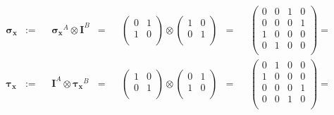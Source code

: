 \documentclass[solutions.tex]{subfiles}
\begin{document}
\begin{equation*}\begin{aligned}
	\bm{\sigma_x} &:=&& \bm{\sigma_x}^A\otimes\bm{I}^B &=&&
	\begin{pmatrix}
		0 & 1 \\
		1 & 0 \\
	\end{pmatrix}\otimes\begin{pmatrix}
		1 & 0 \\
		0 & 1 \\
	\end{pmatrix} &=&& \begin{pmatrix}
		0 & 0 & 1  & 0  \\
		0 & 0 & 0  & 1  \\
		1 & 0 & 0  & 0  \\
		0 & 1 & 0  & 0  \\
	\end{pmatrix} =  \\
	\bm{\tau_x} &:=&& \bm{I}^A\otimes\bm{\tau_x}^B &=&&
	\begin{pmatrix}
		1 & 0 \\
		0 & 1 \\
	\end{pmatrix}\otimes\begin{pmatrix}
		0 & 1 \\
		1 & 0 \\
	\end{pmatrix} &=&& \begin{pmatrix}
		0 & 1 & 0  & 0  \\
		1 & 0 & 0  & 0  \\
		0 & 0 & 0  & 1  \\
		0 & 0 & 1  & 0  \\
	\end{pmatrix}  = \\
\end{aligned}\end{equation*}
\end{document}
